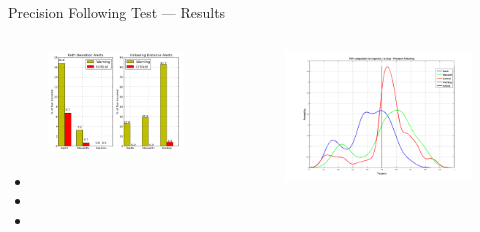 \documentclass{beamer}
\begin{document}
    \begin{frame}{Precision Following Test --- Results}
      \begin{columns}
        \begin{column}{0.5\textwidth}
          \begin{figure}
            \includegraphics[width=\textwidth]{../graphics/precision_following_alert_percents.png}
          \end{figure}
          \begin{itemize}
            \item 
            \item 
            \item 
          \end{itemize}
        \end{column}
        \begin{column}{0.5\textwidth}
          \begin{figure}
            \includegraphics[width=\textwidth]{../graphics/precision_following_mu_distribution.png}

\end{figure}
\end{column}
\end{columns}
\end{frame}
\end{document}
